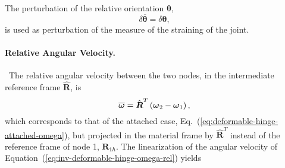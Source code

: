 \documentclass[10pt,dvips,fleqn,subeqn]{report}
\newcommand{\T}[1]{\boldsymbol{#1}}
\newcommand{\TT}[1]{\boldsymbol{#1}}
\begin{document}
The perturbation of the relative orientation $\T{\theta}$, 
\begin{equation}
	\delta\overline{\T{\theta}} = \delta\T{\theta} ,
\end{equation}
is used as perturbation of the measure of the straining of the joint.



\paragraph{Relative Angular Velocity.} \
The relative angular velocity between the two nodes,
in the intermediate reference frame $\hat{\T{R}}$, is
\begin{equation}
	\overline{\T{\omega}} = \hat{\T{R}}^T \plbr{\T{\omega}_2 - \T{\omega}_1}
	\label{eq:inv-deformable-hinge-omega-rel} ,
\end{equation}
which corresponds to that of the attached case,
Eq.~(\ref{eq:deformable-hinge-attached-omega}),
but projected in the material frame by $\hat{\TT{R}}^T$
instead of the reference frame of node 1, $\T{R}_{1h}$.
The linearization of the angular velocity 
of Equation~(\ref{eq:inv-deformable-hinge-omega-rel}) yields
\end{document}
